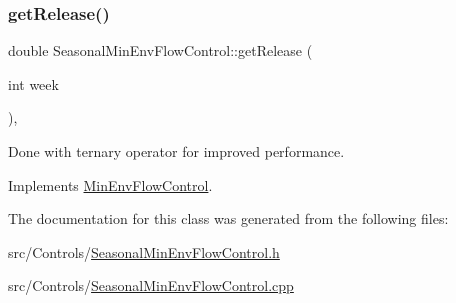 \subsubsection{\texorpdfstring{get\+Release()}{getRelease()}}
{\footnotesize\ttfamily double Seasonal\+Min\+Env\+Flow\+Control\+::get\+Release (\begin{DoxyParamCaption}\item[{int}]{week }\end{DoxyParamCaption})\hspace{0.3cm}{\ttfamily [override]}, {\ttfamily [virtual]}}

Done with ternary operator for improved performance. 

Implements \mbox{\hyperlink{classMinEnvFlowControl_a5de79615852eb0c937dd559a9eb9402d}{Min\+Env\+Flow\+Control}}.



The documentation for this class was generated from the following files\+:\begin{DoxyCompactItemize}
\item 
src/\+Controls/\mbox{\hyperlink{SeasonalMinEnvFlowControl_8h}{Seasonal\+Min\+Env\+Flow\+Control.\+h}}\item 
src/\+Controls/\mbox{\hyperlink{SeasonalMinEnvFlowControl_8cpp}{Seasonal\+Min\+Env\+Flow\+Control.\+cpp}}\end{DoxyCompactItemize}
